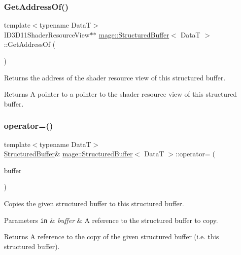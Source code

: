 \subsubsection{\texorpdfstring{Get\+Address\+Of()}{GetAddressOf()}\hspace{0.1cm}{\footnotesize\ttfamily [2/2]}}
{\footnotesize\ttfamily template$<$typename DataT$>$ \\
I\+D3\+D11\+Shader\+Resource\+View$\ast$$\ast$ \hyperlink{structmage_1_1_structured_buffer}{mage\+::\+Structured\+Buffer}$<$ DataT $>$\+::Get\+Address\+Of (\begin{DoxyParamCaption}{ }\end{DoxyParamCaption})\hspace{0.3cm}{\ttfamily [noexcept]}}

Returns the address of the shader resource view of this structured buffer.

\begin{DoxyReturn}{Returns}
A pointer to a pointer to the shader resource view of this structured buffer. 
\end{DoxyReturn}
\hypertarget{structmage_1_1_structured_buffer_ac00255155ab1eb61244392adcf262d40}{}\label{structmage_1_1_structured_buffer_ac00255155ab1eb61244392adcf262d40} 
\subsubsection{\texorpdfstring{operator=()}{operator=()}\hspace{0.1cm}{\footnotesize\ttfamily [1/2]}}
{\footnotesize\ttfamily template$<$typename DataT$>$ \\
\hyperlink{structmage_1_1_structured_buffer}{Structured\+Buffer}\& \hyperlink{structmage_1_1_structured_buffer}{mage\+::\+Structured\+Buffer}$<$ DataT $>$\+::operator= (\begin{DoxyParamCaption}\item[{const \hyperlink{structmage_1_1_structured_buffer}{Structured\+Buffer}$<$ DataT $>$ \&}]{buffer }\end{DoxyParamCaption})\hspace{0.3cm}{\ttfamily [delete]}}

Copies the given structured buffer to this structured buffer.


\begin{DoxyParams}[1]{Parameters}
\mbox{\tt in}  & {\em buffer} & A reference to the structured buffer to copy. \\
\hline
\end{DoxyParams}
\begin{DoxyReturn}{Returns}
A reference to the copy of the given structured buffer (i.\+e. this structured buffer). 
\end{DoxyReturn}
\hypertarget{structmage_1_1_structured_buffer_a2647510e153d15b89f860e2a5c68e231}{}\label{structmage_1_1_structured_buffer_a2647510e153d15b89f860e2a5c68e231} 
